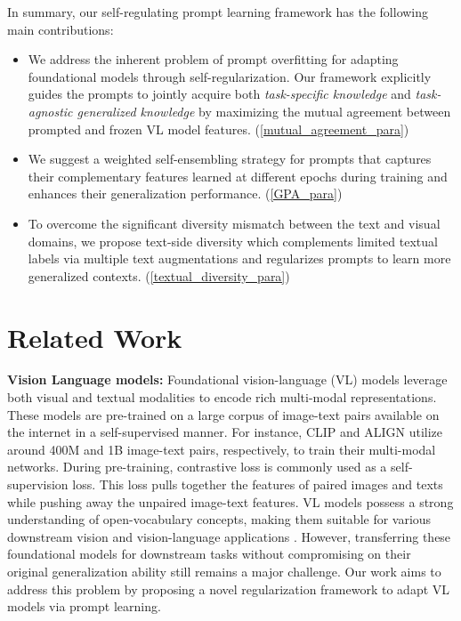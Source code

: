 \documentclass[10pt,twocolumn,letterpaper]{article}
\begin{document}
In summary, our self-regulating prompt learning framework has the following main contributions:\vspace{-0.5em}
\begin{itemize}\setlength{\itemsep}{0em}
\item We address the inherent problem of prompt overfitting for adapting foundational models through self-regularization. Our framework explicitly guides the prompts to jointly acquire both \textit{{task-specific knowledge}} and \textit{{task-agnostic generalized knowledge}} by maximizing the mutual agreement between prompted and frozen VL model features. (\cref{mutual_agreement_para})

\item  We suggest a weighted self-ensembling strategy for prompts that captures their complementary features learned at different epochs during training and enhances their generalization performance. (\cref{GPA_para})

\item To overcome the significant diversity mismatch between  the text and visual domains, we propose text-side diversity which complements limited textual labels via multiple text augmentations and regularizes prompts to learn more generalized contexts. (\cref{textual_diversity_para})
\end{itemize}

\section{Related Work}

\noindent \textbf{Vision Language models:} Foundational vision-language (VL) models \cite{radford2021learning, jia2021scaling, zhai2022lit, yao2021filip, yuan2021florence} leverage both visual and textual modalities to encode rich multi-modal representations. These models are pre-trained on a large corpus of image-text pairs available on the internet in a self-supervised manner. For instance, CLIP \cite{radford2021learning} and ALIGN \cite{jia2021scaling} utilize around 400M and 1B image-text pairs, respectively, to train their multi-modal networks. During pre-training, contrastive loss is commonly used as a self-supervision loss. This loss pulls together the features of paired images and texts while pushing away the unpaired image-text features. VL models possess a strong understanding of open-vocabulary concepts, making them suitable for various downstream vision and vision-language applications \cite{gao2021clip, zhang2021tip, rasheed2022bridging, Maaz2022Multimodal, zhou2022detecting, gu2021open, manzoor2023multimodality, zang2022open, li2022language, rao2022denseclip, ding2022decoupling}.  However, transferring these foundational models for downstream tasks without compromising on their original generalization ability still remains a major challenge. Our work aims to address this problem by proposing a novel regularization framework to adapt VL models via prompt learning.
\end{document}

